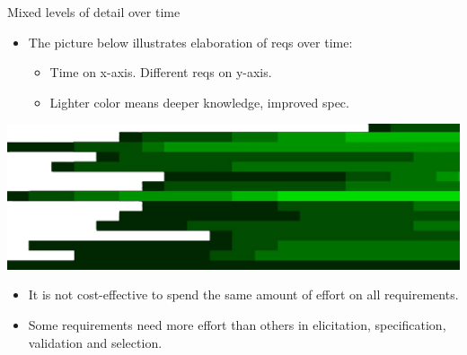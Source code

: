 \begin{Slide}{Mixed levels of detail over time}

\begin{itemize}
\item The picture below illustrates elaboration of reqs over time:
\begin{itemize}
\item Time on x-axis. Different reqs on y-axis. 
\item Lighter color means deeper knowledge, improved spec.

\end{itemize}
\end{itemize}
\begin{minipage}[t]{1.0\textwidth}
\vspace{-1.0em}\includegraphics[width=1.0\textwidth]{../img/details-time}
\end{minipage}

\begin{itemize}
\item It is not cost-effective to spend the same amount of effort on all requirements.

\item Some requirements need more effort than others in elicitation, specification, validation and selection.


\end{itemize}
\end{Slide}